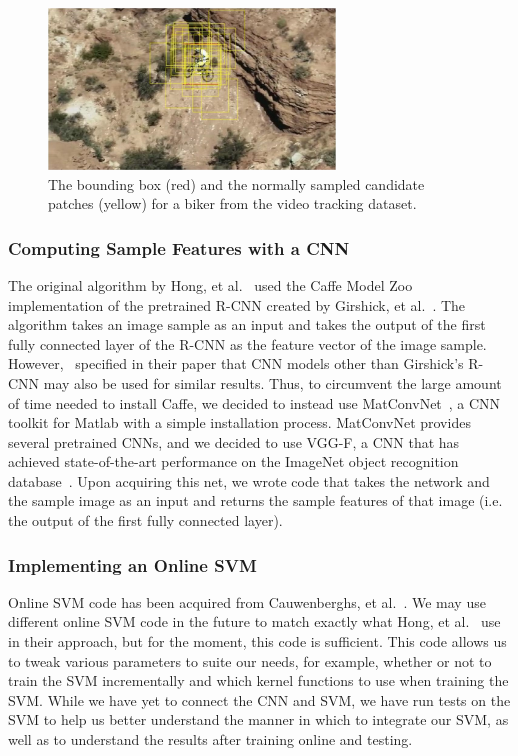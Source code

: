 \documentclass{sig-alternate-05-2015}
\begin{document}
\begin{figure}[h]
\centering
\includegraphics[width = 3in]{samples}
\caption{The bounding box (red) and the normally sampled candidate patches (yellow) for a biker from the video tracking dataset.}
\label{fig:patches}
\end{figure}

\subsubsection{Computing Sample Features with a CNN}
The original algorithm by Hong, et al.~\cite{hong2015online} used the Caffe Model Zoo implementation of the pretrained R-CNN created by Girshick, et al.~\cite{girshick2016region}.
The algorithm takes an image sample as an input and takes the output of the first fully connected layer of the R-CNN as the feature vector of the image sample.
However,~\cite{hong2015online} specified in their paper that CNN models other than Girshick's R-CNN may also be used for similar results.
Thus, to circumvent the large amount of time needed to install Caffe, we decided to instead use MatConvNet~\cite{vedaldi2015matconvnet}, a CNN toolkit for Matlab with a simple installation process.
MatConvNet provides several pretrained CNNs, and we decided to use VGG-F, a CNN that has achieved state-of-the-art performance on the ImageNet object recognition database~\cite{chatfield2014return}.
Upon acquiring this net, we wrote code that takes the network and the sample image as an input and returns the sample features of that image (i.e. the output of the first fully connected layer).

\subsubsection{Implementing an Online SVM}
Online SVM code has been acquired from Cauwenberghs, et al.~\cite{cauwenberghs2001incremental}. 
We may use different online SVM code in the future to match exactly what Hong, et al.~\cite{hong2015online} use in their approach, but for the moment, this code is sufficient. 
This code allows us to tweak various parameters to suite our needs, for example, whether or not to train the SVM incrementally and which kernel functions to use when training the SVM. 
While we have yet to connect the CNN and SVM, we have run tests on the SVM to help us better understand the manner in which to integrate our SVM, as well as to understand the results after training online and testing. 
\end{document}

